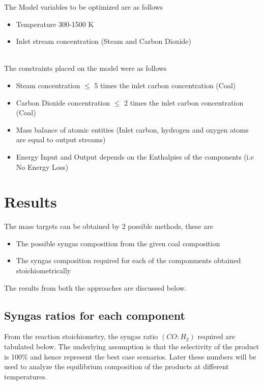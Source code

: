 \documentclass[journal=iecred,manuscript=article]{achemso}
\begin{document}
The Model variables to be optimized are as follows 
\begin{itemize}
\item Temperature 300-1500 K
\item Inlet stream concentration (Steam and Carbon Dioxide)
\end{itemize}
\\
The constraints placed on the model were as follows 
\begin{itemize}
\item Steam concentration $\leq$ 5 times the inlet carbon concentration (Coal)
\item Carbon Dioxide concentration $\leq$ 2 times the inlet carbon concentration (Coal)
\item Mass balance of atomic entities (Inlet carbon, hydrogen and oxygen atoms are equal to output streams)
\item Energy Input and Output depends on the Enthalpies of the components (i.e No Energy Loss)
\end{itemize} 


\section{Results}
The mass targets can be obtained by 2 possible methods,
these are 
\begin{itemize}
\item The possible syngas composition from the given coal composition
\item The syngas composition required for each of the componments obtained stoichiometrically  
\end{itemize}

The results from both the approaches are discussed below.

\subsection{Syngas ratios for each component}
From the reaction stoichiometry, the syngas ratio $(CO:H_2)$ required are tabulated below. The underlying assumption is that the selectivity of the product is 100\% and hence represent the best case scenarios. Later these numbers will be used to analyze the equilibrium composition of the products at different temperatures.\\
\end{document}
